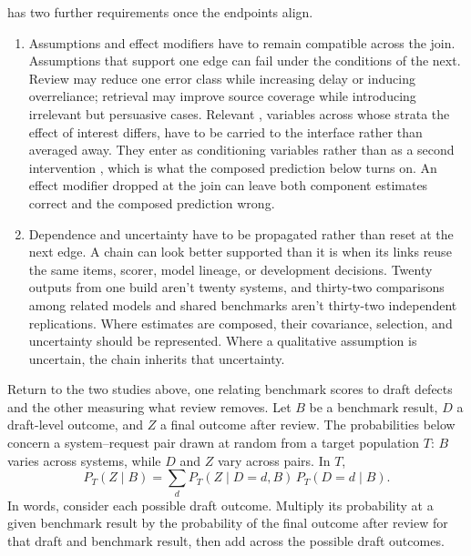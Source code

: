 \documentclass[12pt]{article}
\begin{document}
 has two further requirements once the endpoints align.

\begin{enumerate}
\item Assumptions and effect modifiers have to remain compatible across the join. Assumptions that support one edge can fail under the conditions of the next. Review may reduce one error class while increasing delay or inducing overreliance; retrieval may improve source coverage while introducing irrelevant but persuasive cases. Relevant , variables across whose strata the effect of interest differs, have to be carried to the interface rather than averaged away. They enter as conditioning variables rather than as a second intervention \citep[864]{vanderweele2009interaction}, which is what the composed prediction below turns on. An effect modifier dropped at the join can leave both component estimates correct and the composed prediction wrong.

\item Dependence and uncertainty have to be propagated rather than reset at the next edge. A chain can look better supported than it is when its links reuse the same items, scorer, model lineage, or development decisions. Twenty outputs from one build aren't twenty systems, and thirty-two comparisons among related models and shared benchmarks aren't thirty-two independent replications. Where estimates are composed, their covariance, selection, and uncertainty should be represented. Where a qualitative assumption is uncertain, the chain inherits that uncertainty.
\end{enumerate}

Return to the two studies above, one relating benchmark scores to draft defects and the other measuring what review removes. Let \(B\) be a benchmark result, \(D\) a draft-level outcome, and \(Z\) a final outcome after review. The probabilities below concern a system--request pair drawn at random from a target population \(T\): \(B\) varies across systems, while \(D\) and \(Z\) vary across pairs. In \(T\),
\begin{equation}\label{eq:composition_identity}
P_T(Z\mid B)
  =\sum_d P_T(Z\mid D=d,B)\,P_T(D=d\mid B).
\end{equation}
In words, consider each possible draft outcome. Multiply its probability at a given benchmark result by the probability of the final outcome after review for that draft and benchmark result, then add across the possible draft outcomes.
\end{document}
